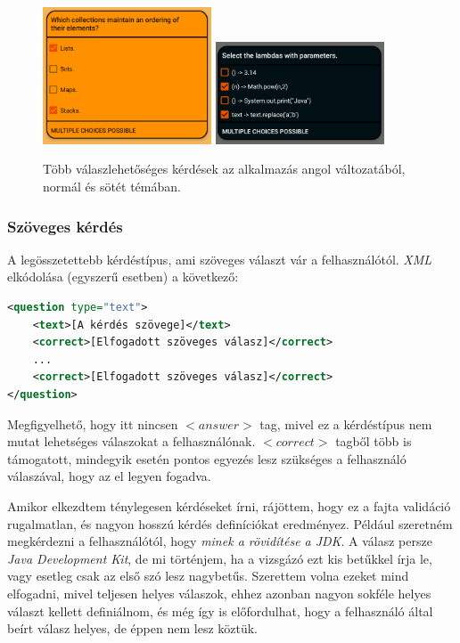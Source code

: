 \documentclass[12pt,a4paper]{article}
\newcommand{\xml}{\textit{XML}\xspace}
\begin{document}
	\begin{figure}[h!]
		\centering
		\includegraphics[width=5cm]{question_multi_choice}
		\includegraphics[width=5cm]{question_multi_choice_dark}
		\caption{Több válaszlehetőséges kérdések az alkalmazás angol változatából, normál és sötét témában.}
		\label{question_multi_choice_figure}
	\end{figure}
	
	\subsubsection{Szöveges kérdés}\label{question_text}
	
	A legösszetettebb kérdéstípus, ami szöveges választ vár a felhasználótól. \xml elkódolása (egyszerű esetben) a következő:
	
	\bigskip
	\begin{lstlisting}[language=XML]
<question type="text">
	<text>[A kérdés szövege]</text>
	<correct>[Elfogadott szöveges válasz]</correct>
	...
	<correct>[Elfogadott szöveges válasz]</correct>
</question>
	\end{lstlisting}
	\bigskip
	
	\noindent
	Megfigyelhető, hogy itt nincsen $<answer>$ tag, mivel ez a kérdéstípus nem mutat lehetséges válaszokat a felhasználónak. $<correct>$ tagből több is támogatott, mindegyik esetén pontos egyezés lesz szükséges a felhasználó válaszával, hogy az el legyen fogadva.
	
	Amikor elkezdtem ténylegesen kérdéseket írni, rájöttem, hogy ez a fajta validáció rugalmatlan, és nagyon hosszú kérdés definíciókat eredményez. Például szeretném megkérdezni a felhasználótól, hogy \textit{minek a rövidítése a JDK}. A válasz persze \textit{Java Development Kit}, de mi történjem, ha a vizsgázó ezt kis betűkkel írja le, vagy esetleg csak az első szó lesz nagybetűs. Szerettem volna ezeket mind elfogadni, mivel teljesen helyes válaszok, ehhez azonban nagyon sokféle helyes választ kellett definiálnom, és még így is előfordulhat, hogy a felhasználó által beírt válasz helyes, de éppen nem lesz köztük.
	
\end{document}
